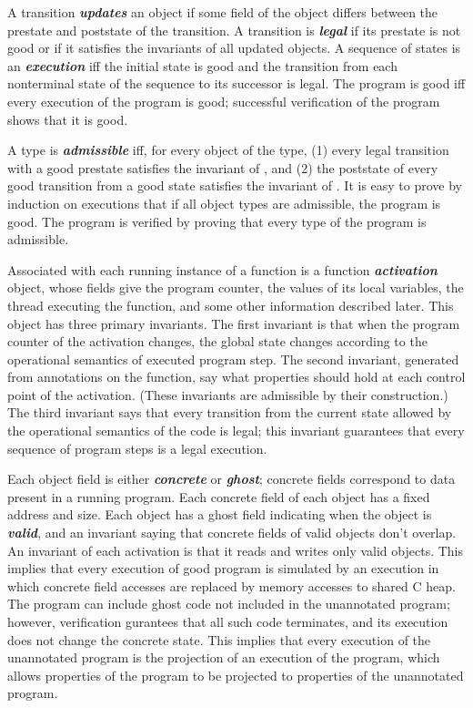 \documentclass[preprint,nocopyrightspace]{sigplanconf}
\newcommand{\Def}[1]{\textit{\textbf{#1}}}
\begin{document}
A transition \Def{updates} an object if some field of the object differs
between the prestate and poststate of the transition. A transition
is \Def{legal} if its prestate is not good or if it satisfies the
invariants of all updated objects. A sequence of states is an
\Def{execution} iff the initial state
is good and the transition from each nonterminal state of the sequence
to its successor is legal. The program is good iff every execution of
the program is good; successful verification of the program shows that
it is good.

A type is \Def{admissible} iff, for every object  of the type,
(1) every legal transition with a good prestate satisfies the
invariant of , and (2) the poststate of every good transition
from a good state satisfies the invariant of . It is easy to
prove by induction on executions that if all object types are
admissible, the program is good. The program is verified by proving
that every type of the program is admissible.


Associated with each running instance of a function is a
function \Def{activation} object, whose fields give the program
counter, the values of its local variables, the thread executing the
function, and some other information described later. This object has
three primary invariants. The first invariant is that when the program
counter of the activation changes, the global state changes according
to the operational semantics of executed program step. The second
invariant, generated from annotations on the function, say what
properties should hold at each control point of the activation. 
(These invariants are admissible by their construction.) The
third invariant says that every transition from the current state
allowed by the operational semantics of the code is legal; this
invariant guarantees that every sequence of program steps is a legal
execution. 

Each object field is either \Def{concrete} or \Def{ghost}; concrete
fields correspond to data present in a running program. 
Each concrete field of each object has a fixed address and 
size.  Each object has a ghost field indicating when the 
object is \Def{valid}, and an invariant saying that concrete fields
of valid objects don't overlap. An invariant
of each activation is that it reads and writes only valid
objects. This implies that every execution of good program is
simulated by an execution in which concrete field accesses are replaced
by memory accesses to shared C heap. 
The program can include ghost code not included in the unannotated
program; however, verification gurantees that all such code
terminates, and its execution does not change the concrete state. 
This implies that every execution of the unannotated program is 
the projection of an execution of the program, which allows properties
of the program to be projected to properties of the unannotated
program. 
\end{document}
